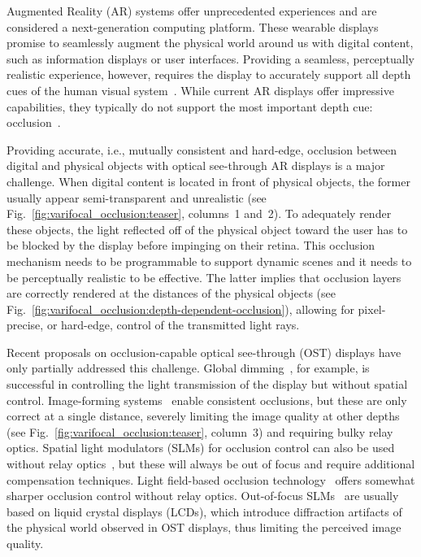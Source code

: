

Augmented Reality (AR) systems offer unprecedented experiences and are considered a next-generation computing platform. These wearable displays promise to seamlessly augment the physical world around us with digital content, such as information displays or user interfaces. Providing a seamless, perceptually realistic experience, however, requires the display to accurately support all depth cues of the human visual system~\cite{Palmer:1999,Howard:2002}. While current AR displays offer impressive capabilities, they typically do not support the most important depth cue: occlusion~\cite{Cutting:1995}.

Providing accurate, i.e., mutually consistent and hard-edge, occlusion between digital and physical objects with optical see-through AR displays is a major challenge. When digital content is located in front of physical objects, the former usually appear semi-transparent and unrealistic (see Fig.~\ref{fig:varifocal_occlusion:teaser}, columns~1 and~2). To adequately render these objects, the light reflected off of the physical object toward the user has to be blocked by the display before impinging on their retina. This occlusion mechanism needs to be programmable to support dynamic scenes and it needs to be perceptually realistic to be effective. The latter implies that occlusion layers are correctly rendered at the distances of the physical objects (see Fig.~\ref{fig:varifocal_occlusion:depth-dependent-occlusion}), allowing for pixel-precise, or hard-edge, control of the transmitted light rays.

Recent proposals on occlusion-capable optical see-through (OST) displays have only partially addressed this challenge. Global dimming~\cite{Mori2018}, for example, is successful in controlling the light transmission of the display but without spatial control. Image-forming systems~\cite{Kiyokawa2003,Cakmakci2004,Gao2012} enable consistent occlusions, but these are only correct at a single distance, severely limiting the image quality at other depths (see Fig.~\ref{fig:varifocal_occlusion:teaser}, column~3) and requiring bulky relay optics. Spatial light modulators (SLMs) for occlusion control can also be used without relay optics~\cite{Itoh2017}, but these will always be out of focus and require additional compensation techniques. Light field-based occlusion technology~\cite{Maimone2013} offers somewhat sharper occlusion control without relay optics. Out-of-focus SLMs~\cite{Maimone2013,Itoh2017} are usually based on liquid crystal displays (LCDs), which introduce diffraction artifacts of the physical world observed in OST displays, thus limiting the perceived image quality.

